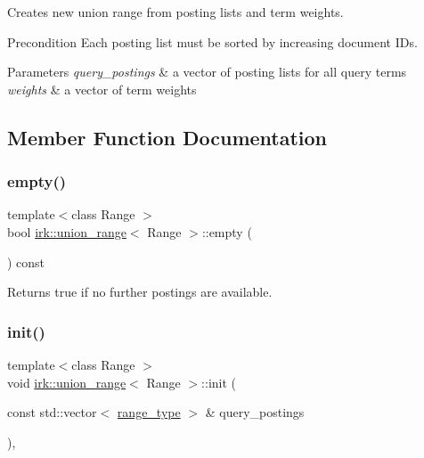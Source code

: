 Creates new union range from posting lists and term weights. 

\begin{DoxyPrecond}{Precondition}
Each posting list must be sorted by increasing document I\+Ds. 
\end{DoxyPrecond}

\begin{DoxyParams}{Parameters}
{\em query\+\_\+postings} & a vector of posting lists for all query terms \\
\hline
{\em weights} & a vector of term weights \\
\hline
\end{DoxyParams}


\subsection{Member Function Documentation}
\mbox{\label{classirk_1_1union__range_a661cc5c6767ecd8b468e5b13fb6460f5}} 
\subsubsection{\texorpdfstring{empty()}{empty()}}
{\footnotesize\ttfamily template$<$class Range $>$ \\
bool \mbox{\hyperlink{classirk_1_1union__range}{irk\+::union\+\_\+range}}$<$ Range $>$\+::empty (\begin{DoxyParamCaption}{ }\end{DoxyParamCaption}) const\hspace{0.3cm}{\ttfamily [inline]}}



Returns true if no further postings are available. 

\mbox{\label{classirk_1_1union__range_a0bd95ecb10bd2f8ee81c5bd23aad3935}} 
\subsubsection{\texorpdfstring{init()}{init()}}
{\footnotesize\ttfamily template$<$class Range $>$ \\
void \mbox{\hyperlink{classirk_1_1union__range}{irk\+::union\+\_\+range}}$<$ Range $>$\+::init (\begin{DoxyParamCaption}\item[{const std\+::vector$<$ \mbox{\hyperlink{classirk_1_1union__range_aae1621f1e73b1b78990ad11eaa52452b}{range\+\_\+type}} $>$ \&}]{query\+\_\+postings }\end{DoxyParamCaption})\hspace{0.3cm}{\ttfamily [inline]}, {\ttfamily [protected]}}




